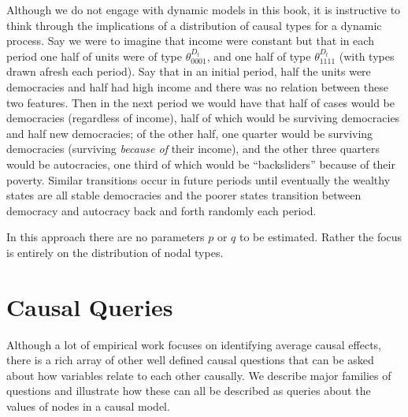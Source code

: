 \documentclass[
  12pt,
]{book}
\newenvironment{headerbox}{
  \definecolor{shadecolor}{rgb}{0.8, 0.8, 0.8}  %
  \color{black}
  \begin{shaded}}{\end{shaded}}
\begin{document}
Although we do not engage with dynamic models in this book, it is instructive to think through the implications of a distribution of causal types for a dynamic process. Say we were to imagine that income were constant but that in each period one half of units were of type \(\theta^{D_t}_{0001}\), and one half of type \(\theta^{D_t}_{1111}\) (with types drawn afresh each period). Say that in an initial period, half the units were democracies and half had high income and there was no relation between these two features. Then in the next period we would have that
half of cases would be democracies (regardless of income), half of which would be surviving democracies and half new democracies; of the other half, one quarter would be surviving democracies (surviving \emph{because of} their income), and the other three quarters would be autocracies, one third of which would be ``backsliders'' because of their poverty. Similar transitions occur in future periods until eventually the wealthy states are all stable democracies and the poorer states transition between democracy and autocracy back and forth randomly each period.

In this approach there are no parameters \(p\) or \(q\) to be estimated. Rather the focus is entirely on the distribution of nodal types.

\hypertarget{questions}{%
\chapter{Causal Queries}\label{questions}}

\begin{headerbox}
Although a lot of empirical work focuses on identifying average causal effects, there is a rich array of other well defined causal questions that can be asked about how variables relate to each other causally. We describe major families of questions and illustrate how these can all be described as queries about the values of nodes in a causal model.

\end{headerbox}
\end{document}
